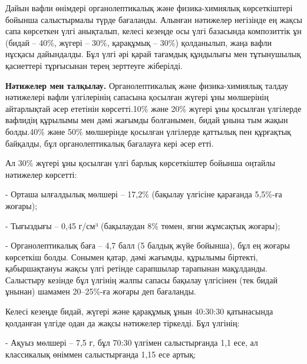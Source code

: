 
Дайын вафли өнімдері органолептикалық және физика-химиялық көрсеткіштері
бойынша салыстырмалы түрде бағаланды. Алынған нәтижелер негізінде ең
жақсы сапа көрсеткен үлгі анықталып, келесі кезеңде осы үлгі базасында
композиттік ұн (бидай -- 40\%, жүгері -- 30\%, қарақұмық -- 30\%)
қолданылып, жаңа вафли нұсқасы дайындалды. Бұл үлгі әрі қарай тағамдық
құндылығы мен тұтынушылық қасиеттері тұрғысынан терең зерттеуге
жіберілді.

{\bfseries Нәтижелер мен талқылау.} Органолептикалық және физика-химиялық
талдау нәтижелері вафли үлгілерінің сапасына қосылған жүгері ұны
мөлшерінің айтарлықтай әсер ететінін көрсетті.10\% және 20\% жүгері ұны
қосылған үлгілерде вафлидің құрылымы мен дәмі жағымды болғанымен, бидай
ұнына тым жақын болды.40\% және 50\% мөлшерінде қосылған үлгілерде
қаттылық пен құрғақтық байқалды, бұл органолептикалық бағалауға кері
әсер етті.

Ал 30\% жүгері ұны қосылған үлгі барлық көрсеткіштер бойынша оңтайлы
нәтижелер көрсетті:


- Орташа ылғалдылық мөлшері -- 17,2\% (бақылау үлгісіне қарағанда
5,5\%-ға жоғары);

- Тығыздығы -- 0,45 г/см³ (бақылаудан 8\% төмен, яғни жұмсақтық жоғары);

- Органолептикалық баға -- 4,7 балл (5 балдық жүйе бойынша), бұл ең
жоғары көрсеткіш болды.
Сонымен қатар, дәмі жағымды, құрылымы біртекті, қабыршақтануы жақсы үлгі
ретінде сарапшылар тарапынан мақұлданды. Салыстыру кезінде бұл үлгінің
жалпы сапасы бақылау үлгісінен (тек бидай ұнынан) шамамен 20--25\%-ға
жоғары деп бағаланды.

Келесі кезеңде бидай, жүгері және қарақұмық ұнын 40:30:30 қатынасында
қолданған үлгіде одан да жақсы нәтижелер тіркелді. Бұл үлгінің:

- Ақуыз мөлшері -- 7,5 г, бұл 70:30 үлгімен салыстырғанда 1,1 есе, ал
классикалық өніммен салыстырғанда 1,15 есе артық;


